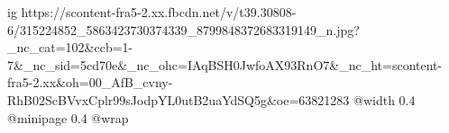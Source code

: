  
 
 
 
 

\ifcmt
  ig https://scontent-fra5-2.xx.fbcdn.net/v/t39.30808-6/315224852_5863423730374339_8799848372683319149_n.jpg?_nc_cat=102&ccb=1-7&_nc_sid=5cd70e&_nc_ohc=IAqBSH0JwfoAX93RnO7&_nc_ht=scontent-fra5-2.xx&oh=00_AfB_cvny-RhB02ScBVvxCplr99sJodpYL0utB2uaYdSQ5g&oe=63821283
  @width 0.4
  @minipage 0.4
  @wrap \parpic[r]
\fi
